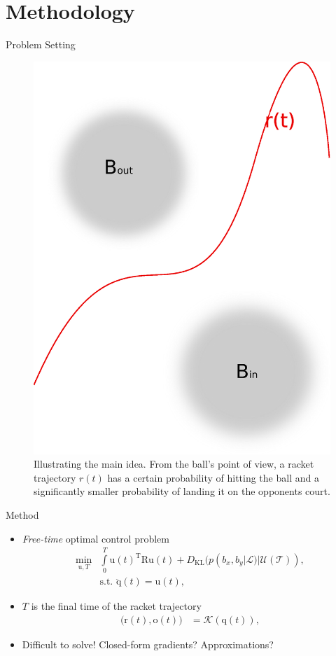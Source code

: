 \documentclass[handout]{beamer}
\newcommand{\boldvec}[1]{\boldsymbol{\mathrm{#1}}}
\let\vec\boldvec
\newcommand{\kin}{\mathcal{K}} %
\newcommand{\joint}{\vec{q}} %
\newcommand{\sysInput}{\vec{u}} %
\newcommand{\racket}{\vec{r}} %
\newcommand{\orient}{\vec{o}} %
\newcommand{\court}{\mathcal{T}} %
\newcommand{\landEvent}{\mathcal{L}} %
\newcommand{\KL}{D_{\mathrm{KL}}}
\begin{document}
\section{Methodology}
%
\begin{frame}{Problem Setting}
\begin{figure}[t!]
\centering
\includegraphics[scale=0.3]{drawingBallsEye.eps}			
\caption{Illustrating the main idea. From the ball's point of view, a racket trajectory $r(t)$ has a certain probability of hitting the ball and a significantly smaller probability of landing it on the opponents court.}
\label{mainIdea2}
\end{figure}
\end{frame}
%
\begin{frame}{Method}
\begin{itemize}
\item \emph{Free-time} optimal control problem
%
\begin{align}
\min_{\sysInput,T} & \int\limits_{0}^{T}\sysInput(t)^{\mathrm{T}}\vec{R}\sysInput(t) + \KL(p(b_x,b_y|\landEvent)|\mathcal{U}(\court)), \\
& \textrm{s.t. } \ddot{\joint}(t) = \sysInput(t),
\label{costFnc1}
\end{align}
%
\item $T$ is the final time of the racket trajectory 
%
\begin{align}
\big(\racket(t),\orient(t)\big) &= \kin(\joint(t)),
\end{align}
%
\item Difficult to solve! Closed-form gradients? Approximations? 
\end{itemize}
\end{frame}
%
\end{document}
